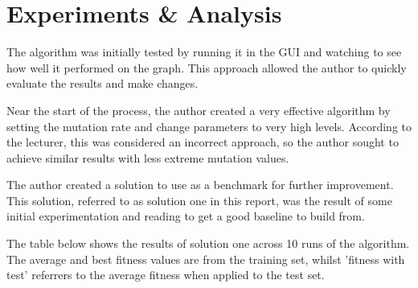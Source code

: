 \documentclass[sigconf]{acmart}
\begin{document}
\section{Experiments \& Analysis}
The algorithm was initially tested by running it in the GUI and watching to see how well it performed on the graph. This approach allowed the author to quickly evaluate the results and make changes. 

Near the start of the process, the author created a very effective algorithm by setting the mutation rate and change parameters to very high levels. According to the lecturer, this was considered an incorrect approach, so the author sought to achieve similar results with less extreme mutation values.

The author created a solution to use as a benchmark for further improvement. This solution, referred to as solution one in this report, was the result of some initial experimentation and reading to get a good baseline to build from.

The table below shows the results of solution one across 10 runs of the algorithm. The average and best fitness values are from the training set, whilst 'fitness with test' referrers to the average fitness when applied to the test set.
\end{document}
